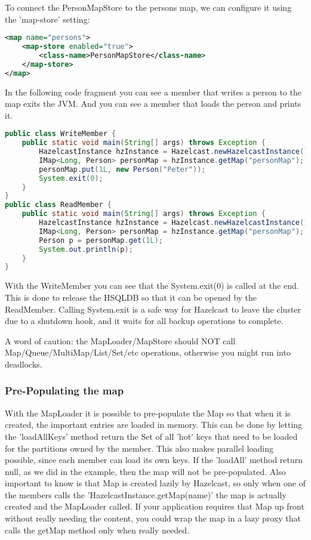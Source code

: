 To connect the PersonMapStore to the persons map, we can configure it using the 'map-store' setting:
\begin{lstlisting}[language=xml]
<map name="persons">
    <map-store enabled="true">
        <class-name>PersonMapStore</class-name>
    </map-store>
</map>
\end{lstlisting}
In the following code fragment you can see a member that writes a person to the map exits the JVM. And you can see a member that loads the person and prints it. 
\begin{lstlisting}[language=java]
public class WriteMember {
    public static void main(String[] args) throws Exception {
        HazelcastInstance hzInstance = Hazelcast.newHazelcastInstance();
        IMap<Long, Person> personMap = hzInstance.getMap("personMap");
        personMap.put(1L, new Person("Peter"));
        System.exit(0);
    }
}
public class ReadMember {
    public static void main(String[] args) throws Exception {
        HazelcastInstance hzInstance = Hazelcast.newHazelcastInstance();
        IMap<Long, Person> personMap = hzInstance.getMap("personMap");
        Person p = personMap.get(1L);
        System.out.println(p);
    }
}
\end{lstlisting}
With the WriteMember you can see that the System.exit(0) is called at the end. This is done to release the HSQLDB so that it can be opened by the ReadMember. Calling System.exit is a safe way for Hazelcast to leave the cluster  due to a shutdown hook, and it waits for all backup operations to complete.

A word of caution: the MapLoader/MapStore should NOT call Map/Queue/MultiMap/List/Set/etc operations, otherwise you might run into deadlocks. 

\subsubsection{Pre-Populating the map}
With the MapLoader it is possible to pre-populate the Map so that when it is created, the important entries are loaded in memory. This can be done by letting the 'loadAllKeys' method return the Set of all 'hot' keys that need to be loaded for the partitions owned by the member. This also makes parallel loading possible, since each member can load its own keys.  If the 'loadAll' method return null, as we did in the example, then the map will not be pre-populated. Also important to know is that Map is created lazily by Hazelcast, so only when one of the members calls the 'HazelcastInstance.getMap(name)' the map is actually created and the MapLoader called. If your application requires that Map up front without really needing the content, you could wrap the map in a lazy proxy that calls the getMap method only when really needed.

